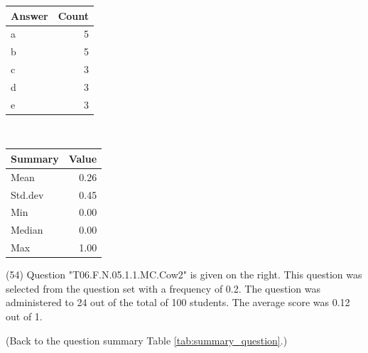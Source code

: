 \documentclass[12pt,nohyper]{tufte-handout}\usepackage[]{graphicx}\usepackage[]{color}
\begin{document}
\begin{center}%
\begin{tabular}{lr}
  \hline
Answer & Count \\ 
  \hline
a &   5 \\ 
  b &   5 \\ 
  c &   3 \\ 
  d &   3 \\ 
  e &   3 \\ 
   \hline
\end{tabular}
~~~~~~~~%
\begin{tabular}{lr}
  \hline
Summary & Value \\ 
  \hline
Mean & 0.26 \\ 
  Std.dev & 0.45 \\ 
  Min & 0.00 \\ 
  Median & 0.00 \\ 
  Max & 1.00 \\ 
   \hline
\end{tabular}
\end{center}\newpage{} (54) Question "T06.F.N.05.1.1.MC.Cow2" is given on the right. This question was selected from the question set with a frequency of 0.2. The question was administered to 24 out of the total of 100 students. The average score was 0.12 out of 1.

 (Back to the question summary Table \ref{tab:summary_question}.)
\end{document}
